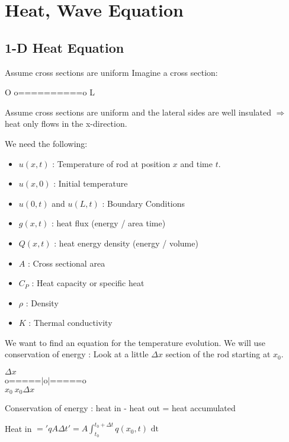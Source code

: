 \newpage
\section{Heat, Wave Equation}

\subsection{1-D Heat Equation}

Assume cross sections are uniform
Imagine a cross section:
%
\begin{center}
  O o==========o L
\end{center}

Assume cross sections are uniform and the lateral sides are well insulated $\Rightarrow$ heat only flows in the x-direction.

We need the following:
%
\begin{itemize}
  \item $u(x, t)$ : Temperature of rod at position $x$ and time $t$.
  \item $u(x, 0)$ : Initial temperature
  \item $u(0, t)$ and $u(L, t)$ : Boundary Conditions
\end{itemize}

\dfn
%
\begin{itemize}
  \item $g(x, t)$ : heat flux (energy / area time)
  \item $Q(x, t)$ : heat energy density (energy / volume)
  \item $A$ : Cross sectional area
  \item $C_P$ : Heat capacity or specific heat
  \item $\rho$ : Density
  \item $K$ : Thermal conductivity
\end{itemize}

We want to find an equation for the temperature evolution. We will use conservation of energy : Look at a little $\Delta x$ section of the rod starting at $x_0$.
%
\begin{center}
  $\Delta x$\\
  o=====$|$o$|$=====o\\
  $x_0\  x_0\Delta x$
\end{center}

Conservation of energy : heat in - heat out = heat accumulated

Heat in $ = 'qA\Delta t' = A \int_{t_0}^{t_0 + \Delta t} q(x_0, t) \text{ dt}$


